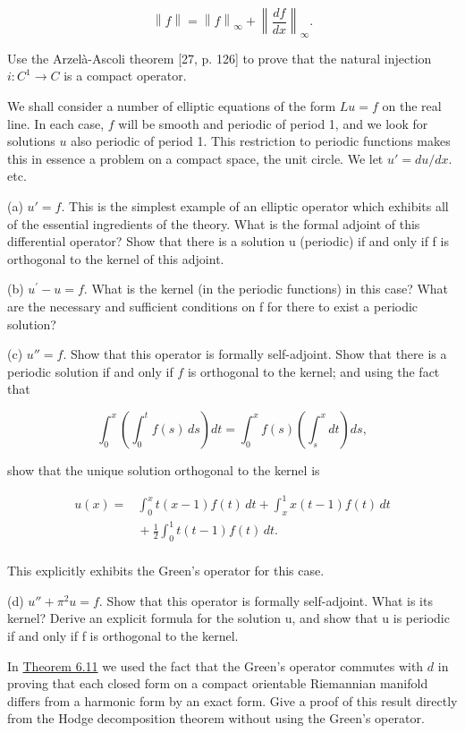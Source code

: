 \begin{problemset}
\[
\left\|f\right\|=\left\|f\right\|_{\infty}+\left\|\frac{d f}{d x}\right\|_{\infty}.
\]

Use the Arzelà-Ascoli theorem [27, p. 126] to prove that the natural injection $i\colon C^{1}\to C$ is a compact operator.

\item We shall consider a number of elliptic equations of the form $Lu = f$ on the real line. In each case, $f$ will be smooth and periodic of period 1, and we look for solutions $u$ also periodic of period 1. This restriction to periodic functions makes this in essence a problem on a compact space, the unit circle. We let $u' = du/dx$. etc.

(a)  $ u' = f $. This is the simplest example of an elliptic operator which exhibits all of the essential ingredients of the theory. What is the formal adjoint of this differential operator? Show that there is a solution u (periodic) if and only if f is orthogonal to the kernel of this adjoint. 

(b)  $ u^{\prime}-u=f $. What is the kernel (in the periodic functions) in this case? What are the necessary and sufficient conditions on f for there to exist a periodic solution?

(c) $u'' = f$. Show that this operator is formally self-adjoint. Show that there is a periodic solution if and only if $f$ is orthogonal to the kernel; and using the fact that

\[
\int_{0}^{x}\left(\int_{0}^{t}f(s)\,ds\right)dt=\int_{0}^{x}f(s)\left(\int_{s}^{x}dt\right)ds,
\]

show that the unique solution orthogonal to the kernel is

\[
\begin{aligned}{u(x)=}&{{}\int_{0}^{x}t(x-1)f(t)\,dt+\int_{x}^{1}x(t-1)f(t)\,dt}\\ {}&{{}+\frac{1}{2}\int_{0}^{1}t(t-1)f(t)\,dt.}\\ \end{aligned}
\]

This explicitly exhibits the Green's operator for this case.

(d) $u'' + \pi^2 u = f$. Show that this operator is formally self-adjoint. What is its kernel? Derive an explicit formula for the solution u, and show that u is periodic if and only if f is orthogonal to the kernel.

\item In \hyperref[thm:6.11]{Theorem 6.11} we used the fact that the Green's operator commutes with $d$ in proving that each closed form on a compact orientable Riemannian manifold differs from a harmonic form by an exact form. Give a proof of this result directly from the Hodge decomposition theorem without using the Green's operator.


\end{problemset}
